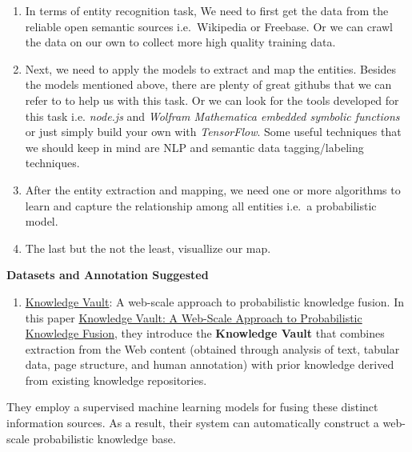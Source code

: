 \documentclass{acm_proc_article-sp}
\renewcommand{\paragraph}[1]{\vskip 6pt\noindent\textbf{#1 }}
\providecommand{\tightlist}{%
  \setlength{\itemsep}{0pt}\setlength{\parskip}{0pt}}
\begin{document}
\begin{enumerate}
\def\labelenumi{\arabic{enumi}.}
\item
  In terms of entity recognition task, We need to first get the data
  from the reliable open semantic sources i.e.~Wikipedia or Freebase. Or
  we can crawl the data on our own to collect more high quality training
  data.
\item
  Next, we need to apply the models to extract and map the entities.
  Besides the models mentioned above, there are plenty of great githubs
  that we can refer to to help us with this task. Or we can look for the
  tools developed for this task i.e. \emph{node.js} and \emph{Wolfram
  Mathematica embedded symbolic functions} or just simply build your own
  with \emph{TensorFlow}. Some useful techniques that we should keep in
  mind are NLP and semantic data tagging/labeling techniques.
\item
  After the entity extraction and mapping, we need one or more
  algorithms to learn and capture the relationship among all entities
  i.e.~a probabilistic model.
\item
  The last but the not the least, visuallize our map.
\end{enumerate}

\paragraph{Datasets and Annotation
Suggested}\label{datasets-and-annotation-suggested-1}

\begin{enumerate}
\def\labelenumi{\arabic{enumi}.}
\tightlist
\item
  \href{https://ai.google/research/pubs/pub45634}{Knowledge Vault}: A
  web-scale approach to probabilistic knowledge fusion. In this paper
  \href{https://dejanseo.com.au/wp-content/uploads/2014/08/Knowledge-Vault-A-Web-Scale-Approach-to-Probabilistic-Knowledge-Fusion.pdf}{Knowledge
  Vault: A Web-Scale Approach to Probabilistic Knowledge Fusion}, they
  introduce the \textbf{Knowledge Vault} that combines extraction from
  the Web content (obtained through analysis of text, tabular data, page
  structure, and human annotation) with prior knowledge derived from
  existing knowledge repositories.
\end{enumerate}

They employ a supervised machine learning models for fusing these
distinct information sources. As a result, their system can
automatically construct a web-scale probabilistic knowledge base.
\end{document}
